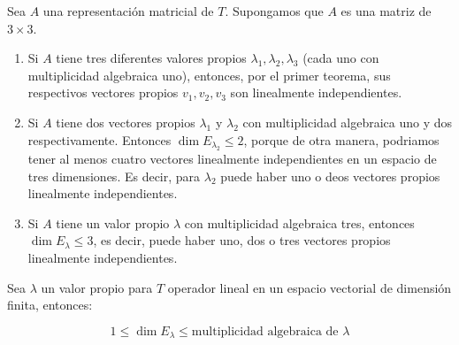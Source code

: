 		\begin{proposicion}
			Sea $A$ una representación matricial de $T$. Supongamos que $A$ es una matriz de $3 \times 3$.

			\begin{enumerate}
				\item Si $A$ tiene tres diferentes valores propios $\lambda_1, \lambda_2, \lambda_3$ (cada uno con multiplicidad algebraica uno), entonces, por el primer teorema, sus respectivos vectores propios $v_1, v_2, v_3$ son linealmente independientes.
				\item Si $A$ tiene dos vectores propios $\lambda_1$ y $\lambda_2$ con multiplicidad algebraica uno y dos respectivamente.
				Entonces $\dim{E_{\lambda_2}} \leq 2$, porque de otra manera, podriamos tener al menos cuatro vectores linealmente independientes en un espacio de tres dimensiones.
				Es decir, para $\lambda_2$ puede haber uno o deos vectores propios linealmente independientes.
				\item Si $A$ tiene un valor propio $\lambda$ con multiplicidad algebraica tres, entonces $\dim{E_{\lambda}} \leq 3$, es decir, puede haber uno, dos o tres vectores propios linealmente independientes.
			\end{enumerate}
		\end{proposicion}

		\begin{teorema}
			Sea $\lambda$ un valor propio para $T$ operador lineal en un espacio vectorial de dimensión finita, entonces:

			\begin{equation}
				1 \leq \dim{E_{\lambda}} \leq \text{multiplicidad algebraica de } \lambda
			\end{equation}
		\end{teorema}

